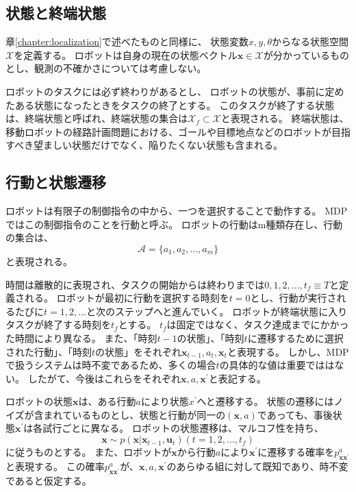\subsection{状態と終端状態}
章\ref{chapter:localization}で述べたものと同様に、
状態変数$x,y,\theta$からなる状態空間$\mathcal{X}$を定義する。
ロボットは自身の現在の状態ベクトル$\bm{x} \in \mathcal{X}$が分かっているものとし、観測の不確かさについては考慮しない。

ロボットのタスクには必ず終わりがあるとし、
ロボットの状態が、事前に定めたある状態になったときをタスクの終了とする。
このタスクが終了する状態は、終端状態と呼ばれ、終端状態の集合は$\mathcal{X}_f \subset \mathcal{X}$と表現される。
終端状態は、移動ロボットの経路計画問題における、ゴールや目標地点などのロボットが目指すべき望ましい状態だけでなく、陥りたくない状態も含まれる。

\subsection{行動と状態遷移}
ロボットは有限子の制御指令の中から、一つを選択することで動作する。
MDPではこの制御指令のことを行動と呼ぶ。
ロボットの行動はm種類存在し、行動の集合は、
\begin{equation}
\label{action}
  \mathcal{A} = \{ a_{1}, a_{2}, \ldots , a_{m} \}
\end{equation}
と表現される。

時間は離散的に表現され、タスクの開始からは終わりまでは${0,1,2,\ldots,t_{f}} \equiv T$と定義される。
ロボットが最初に行動を選択する時刻を$t=0$とし、行動が実行されるたびに$t=1,2,\ldots$と次のステップへと進んでいく。
ロボットが終端状態に入りタスクが終了する時刻を$t_{f}$とする。
$t_{f}$は固定ではなく、タスク達成までにかかった時間により異なる。
また、「時刻$t-1$の状態」、「時刻$t$に遷移するために選択された行動」、「時刻$t$の状態」をそれぞれ$\bm{x}_{t-1}, a_{t}, \bm{x}_{t}$と表現する。
しかし、MDPで扱うシステムは時不変であるため、多くの場合$t$の具体的な値は重要でははない。
したがて、今後はこれらをそれぞれ$\bm{x}, a, \bm{x}^{'}$と表記する。

ロボットの状態$\bm{x}$は、ある行動$a$により状態$x^{'}$へと遷移する。
状態の遷移にはノイズが含まれているものとし、状態と行動が同一の$(\bm{x}, a)$であっても、事後状態$\bm{x}^{'}$は各試行ごとに異なる。
ロボットの状態遷移は、マルコフ性を持ち、
\begin{equation}
\label{trans prob}
  \bm{x} \sim p(\bm{x} | \bm{x}_{t-1}, \bm{u}_t) (t=1,2,\ldots,t_{f})
\end{equation}
に従うものとする。
また、ロボットが$\bm{x}$から行動$a$により$\bm{x}^{'}$に遷移する確率を$p^{a}_{\bm{x}\bm{x}^{'}}$と表現する。
この確率$p^{a}_{\bm{x}\bm{x}^{'}}$が、$\bm{x}, a, \bm{x}^{'}$のあらゆる組に対して既知であり、時不変であると仮定する。


